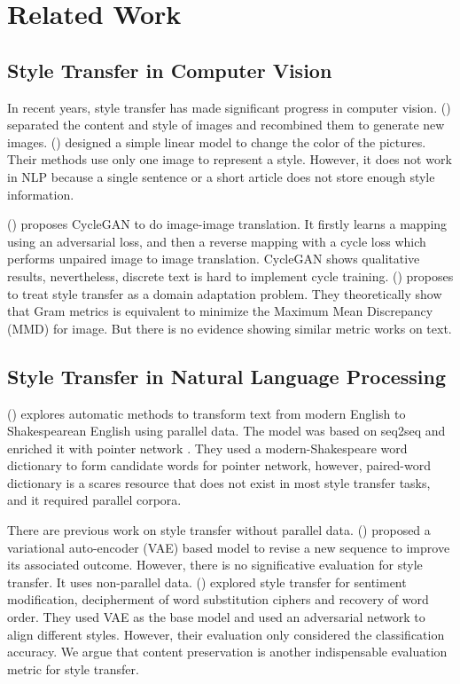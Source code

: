 \documentclass[letterpaper]{article} \usepackage{aaai18}  \usepackage{times}  \usepackage{helvet}  \usepackage{courier}  \usepackage{url}  \usepackage{graphicx}  \usepackage{amsmath}
\newcommand{\newcite}[1]{\citeauthor{#1} (\citeyear{#1})}
\begin{document}
\noindent
\section{Related Work}

\subsection{Style Transfer in Computer Vision}
In recent years, style transfer has made significant progress in computer vision. 
\newcite{gatys2016image} separated the content and style of images and recombined them to generate new images. 
\newcite{gatys2016preserving} designed a simple linear model to change the color of the pictures.
Their methods use only one image to represent a style.
However, it does not work in NLP because a single sentence or a short article does not store enough style information.

\newcite{zhu2017unpaired} proposes CycleGAN to do image-image translation. 
It firstly learns a mapping  using an adversarial loss, 
and then a reverse mapping  with a cycle loss  which performs unpaired image to image translation. 
CycleGAN shows qualitative results, nevertheless, discrete text is hard to implement cycle training. 
\newcite{li2017demystifying} proposes  
to treat style transfer as a domain adaptation problem. 
They theoretically show that Gram metrics is equivalent to minimize the Maximum Mean Discrepancy (MMD) for image. 
But there is no evidence showing similar metric works on text. 


\subsection{Style Transfer in Natural Language Processing}
\newcite{jhamtani2017shakespearizing} explores automatic methods to transform text from modern English to 
Shakespearean English using parallel data. The model was based on seq2seq and enriched it with pointer network \cite{vinyals2015pointer}.
They used a modern-Shakespeare word dictionary to form candidate words for pointer network, 
however, paired-word dictionary is a scares resource that does not exist in most style transfer tasks,
and it required parallel corpora.


There are previous work on style transfer without parallel data. 
\newcite{mueller2017sequence} proposed a variational auto-encoder (VAE) based model 
to revise a new sequence to improve its associated outcome.
However, there is no significative evaluation for style transfer.
It uses non-parallel data.
\newcite{shen2017style} explored style transfer for sentiment modification,
decipherment of word substitution ciphers and recovery of word order. 
They used VAE as the base model and used an adversarial network to align different styles. 
However, their evaluation only considered the classification accuracy.  
We argue that content preservation is another indispensable evaluation metric for style transfer. 
\end{document}

